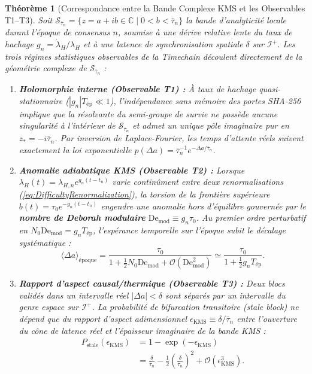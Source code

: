 \documentclass[10pt,twocolumn,a4paper]{article}
\theoremstyle{plain}
\newtheorem{theorem}{Théorème}[section]
\theoremstyle{definition}
\theoremstyle{remark}
\newcommand{\scri}{\mathcal{I}}
\begin{document}
\begin{theorem}[Correspondance entre la Bande Complexe KMS et les Observables T1--T3]
\label{thm:kms_observables}
Soit $\mathcal{S}_{\bar{\tau}_n} = \{ z = a + ib \in \mathbb{C} \mid 0 < b < \bar{\tau}_n \}$ la bande d'analyticité locale durant l'époque de consensus $n$, soumise à une dérive relative lente du taux de hachage $g_n = \dot{\lambda}_H / \lambda_H$ et à une latence de synchronisation spatiale $\delta$ sur $\scri^+$. Les trois régimes statistiques observables de la Timechain découlent directement de la géométrie complexe de $\mathcal{S}_{\bar{\tau}_n}$ :
\begin{enumerate}
    \item \textbf{Holomorphie interne (Observable T1) :} À taux de hachage quasi-stationnaire ($|g_n| T_{\text{ép}} \ll 1$), l'indépendance sans mémoire des portes SHA-256 implique que la résolvante du semi-groupe de survie ne possède aucune singularité à l'intérieur de $\mathcal{S}_{\bar{\tau}_n}$ et admet un unique pôle imaginaire pur en $z_* = -i\bar{\tau}_n$. Par inversion de Laplace-Fourier, les temps d'attente réels suivent exactement la loi exponentielle $p(\Delta a) = \bar{\tau}_n^{-1} e^{-\Delta a / \bar{\tau}_n}$.
    \item \textbf{Anomalie adiabatique KMS (Observable T2) :} Lorsque $\lambda_H(t) = \lambda_{H,n} e^{g_n (t - t_n)}$ varie continûment entre deux renormalisations (\ref{eq:DifficultyRenormalization}), la torsion de la frontière supérieure $b(t) = \tau_0 e^{-g_n(t-t_n)}$ engendre une anomalie hors d'équilibre gouvernée par le \textbf{nombre de Deborah modulaire} $\mathrm{De}_{\text{mod}} \equiv g_n \tau_0$. Au premier ordre perturbatif en $N_0 \mathrm{De}_{\text{mod}} = g_n T_{\text{ép}}$, l'espérance temporelle sur l'époque subit le décalage systématique :
    \begin{equation}
        \langle \Delta a \rangle_{\text{époque}} = \frac{\tau_0}{1 + \frac{1}{2} N_0 \mathrm{De}_{\text{mod}} + \mathcal{O}(\mathrm{De}_{\text{mod}}^2)} \simeq \frac{\tau_0}{1 + \frac{1}{2} g_n T_{\text{ép}}}.
        \label{eq:AdiabaticAnomalyKMS}
    \end{equation}
    \item \textbf{Rapport d'aspect causal/thermique (Observable T3) :} Deux blocs validés dans un intervalle réel $|\Delta a| < \delta$ sont séparés par un intervalle du genre espace sur $\scri^+$. La probabilité de bifurcation transitoire (\textit{stale block}) ne dépend que du rapport d'aspect adimensionnel $\epsilon_{\text{KMS}} \equiv \delta / \bar{\tau}_n$ entre l'ouverture du cône de latence réel et l'épaisseur imaginaire de la bande KMS :
    \begin{equation}
    \begin{split}
        P_{\text{stale}}(\epsilon_{\text{KMS}}) &= 1 - \exp(-\epsilon_{\text{KMS}}) \\
        &= \frac{\delta}{\bar{\tau}_n} - \frac{1}{2}\left(\frac{\delta}{\bar{\tau}_n}\right)^2 + \mathcal{O}(\epsilon_{\text{KMS}}^3).
    \end{split}
    \label{eq:AspectRatioStale}
    \end{equation}
\end{enumerate}
\end{theorem}
\end{document}
